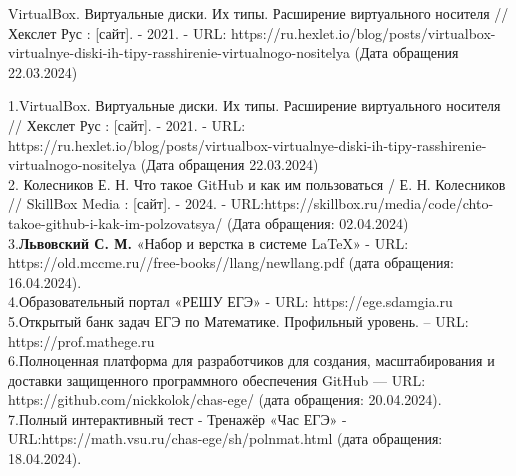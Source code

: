 \begin{thebibliography}{99}

VirtualBox. Виртуальные диски. Их типы. Расширение виртуального носителя // Хекслет Рус : [сайт]. - 2021. - URL: https://ru.hexlet.io/blog/posts/virtualbox-virtualnye-diski-ih-tipy-rasshirenie-virtualnogo-nositelya (Дата обращения 22.03.2024)

\end{thebibliography}

1.\quad VirtualBox. Виртуальные диски. Их типы. Расширение виртуального носителя // Хекслет Рус : [сайт]. - 2021. - URL: https://ru.hexlet.io/blog/posts/virtualbox-virtualnye-diski-ih-tipy-rasshirenie-virtualnogo-nositelya (Дата обращения 22.03.2024)
\\ 2. \quad Колесников Е. Н. Что такое GitHub и как им пользоваться / Е. Н. Колесников // SkillBox Media : [сайт]. - 2024. - URL:https://skillbox.ru/media/code/chto-takoe-github-i-kak-im-polzovatsya/ (Дата обращения: 02.04.2024)
\\3.\quad \textbf{Львовский С. М.} «Набор и верстка в системе LaTeX» - URL: https://old.mccme.ru//free-books//llang/newllang.pdf (дата обращения: 16.04.2024).
\\4.\quad Образовательный портал «РЕШУ ЕГЭ» - URL: https://ege.sdamgia.ru 
\\5.\quad Открытый банк задач ЕГЭ по Математике. Профильный уровень. – URL: https://prof.mathege.ru
\\6.\quad Полноценная платформа для разработчиков для создания, масштабирования и доставки защищенного программного обеспечения GitHub — URL: https://github.com/nickkolok/chas-ege/ (дата обращения: 20.04.2024).  
\\7.\quad Полный интерактивный тест - Тренажёр «Час ЕГЭ» - URL:https://math.vsu.ru/chas-ege/sh/polnmat.html (дата обращения: 18.04.2024).